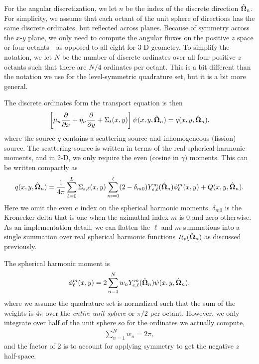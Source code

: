 For the angular discretization, we let $n$ be the index of the discrete direction $\hat{\mathbf{\Omega}}_n$. For simplicity, we assume that each octant of the unit sphere of directions has the same discrete ordinates, but reflected across planes. Because of symmetry across the $x$-$y$ plane, we only need to compute the angular fluxes on the positive $z$ space or four octants---as opposed to all eight for 3-D geometry. To simplify the notation, we let $N$ be the number of discrete ordinates over all four positive $z$ octants such that there are $N/4$ ordinates per octant. This is a bit different than the notation we use for the level-symmetric quadrature set, but it is a bit more general.

The discrete ordinates form the transport equation is then
\begin{align}
  \left[ \mu_n \frac{ \partial {} }{ \partial {x} } + \eta_n \frac{ \partial {} }{ \partial {y} } + \Sigma_t(x,y) \right] \psi(x,y,\hat{\mathbf{\Omega}}_n) = q(x,y,\hat{\mathbf{\Omega}}_n) , \label{Eq:transport_discreteOrdinatesTransportEquation_2DCartesian}
\end{align}
where the source $q$ contains a scattering source and inhomogeneous (fission) source. The scattering source is written in terms of the real-spherical harmonic moments, and in 2-D, we only require the even (cosine in $\gamma)$ moments. This can be written compactly as
\begin{align}
  q(x,y,\hat{\mathbf{\Omega}}_n) = \frac{1}{4\pi} \sum_{\ell=0}^L \Sigma_{s,\ell}(x,y) \sum_{m=0}^\ell ( 2 - \delta_{m0} ) Y_{e,\ell}^m(\hat{\mathbf{\Omega}}_n) \phi_\ell^m(x,y)  + Q(x,y,\hat{\mathbf{\Omega}}_n) .
\end{align} 
Here we omit the even $e$ index on the spherical harmonic moments. $\delta_{m0}$ is the Kronecker delta that is one when the azimuthal index $m$ is $0$ and zero otherwise. As an implementation detail, we can flatten the $\ell$ and $m$ summations into a single summation over real spherical harmonic functions $R_p(\hat{\mathbf{\Omega}}_n)$ as discussed previously. 

The spherical harmonic moment is
\begin{align}
  \phi_\ell^m(x,y) = 2 \sum_{n=1}^N w_n Y_{e,\ell}^m(\hat{\mathbf{\Omega}}_n) \psi(x,y,\hat{\mathbf{\Omega}}_n) ,
\end{align}
where we assume the quadrature set is normalized such that the sum of the weights is $4\pi$ over the \emph{entire unit sphere} or $\pi/2$ per octant. However, we only integrate over half of the unit sphere so for the ordinates we actually compute,
\begin{align}
  \sum_{n=1}^N w_n = 2\pi ,
\end{align}
and the factor of 2 is to account for applying symmetry to get the negative $z$ half-space. 

